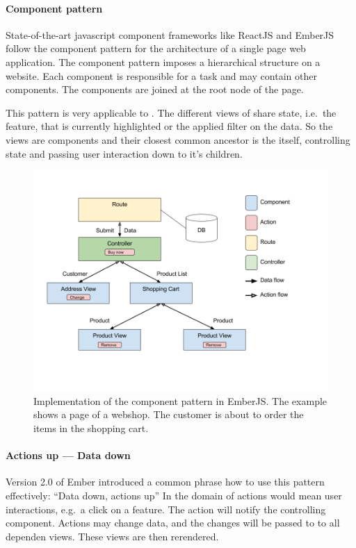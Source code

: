 \paragraph{Component pattern}
State-of-the-art javascript component frameworks like ReactJS and EmberJS follow the component pattern for the architecture of a single page web application.
The component pattern imposes a hierarchical structure on a website.
Each component is responsible for a task and may contain other components.
The components are joined at the root node of the page.

This pattern is very applicable to \cmvs{}.
The different views of \cmvs{} share state, i.e.\ the feature, that is currently highlighted or the applied filter on the data.
So the views are components and their closest common ancestor is the \cmv{} itself, controlling state and passing user interaction down to it's children.

\begin{figure}[h!]
  \centering
  \includegraphics[width=\textwidth]{images/data-down-actions-up.png}
  \caption{%
    Implementation of the component pattern in EmberJS\@.
    The example shows a page of a webshop.
    The customer is about to order the items in the shopping cart.
  }\label{fig:implementation:data-down-actions-up}
\end{figure}

\paragraph{Actions up --- Data down}

Version 2.0 of Ember introduced a common phrase how to use this pattern effectively: ``Data down, actions up''\cite{Emberigniter2017}
In the domain of \cmvs{} actions would mean user interactions, e.g.\ a click on a feature.
The action will notify the controlling \cmv{} component.
Actions may change data, and the changes will be passed to to all dependen views.
These views are then rerendered.

